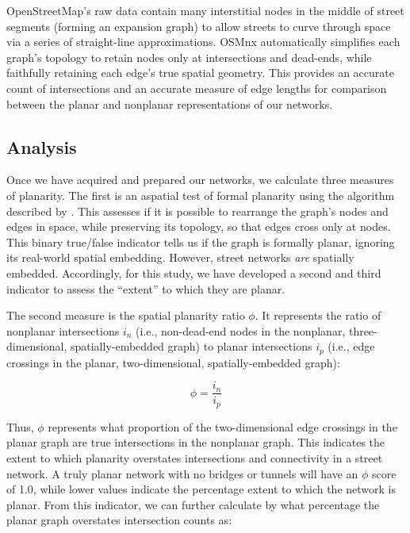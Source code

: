 \documentclass[Afour,sageh,times]{sagej}
\begin{document}
OpenStreetMap's raw data contain many interstitial nodes in the middle of street segments (forming an expansion graph) to allow streets to curve through space via a series of straight-line approximations. OSMnx automatically simplifies each graph's topology to retain nodes only at intersections and dead-ends, while faithfully retaining each edge's true spatial geometry. This provides an accurate count of intersections and an accurate measure of edge lengths for comparison between the planar and nonplanar representations of our networks.

\subsection{Analysis}

Once we have acquired and prepared our networks, we calculate three measures of planarity. The first is an aspatial test of formal planarity using the algorithm described by \citet{boyer_subgraph_2012}. This assesses if it is possible to rearrange the graph's nodes and edges in space, while preserving its topology, so that edges cross only at nodes. This binary true/false indicator tells us if the graph is formally planar, ignoring its real-world spatial embedding. However, street networks \emph{are} spatially embedded. Accordingly, for this study, we have developed a second and third indicator to assess the \enquote{extent} to which they are planar.

The second measure is the spatial planarity ratio $\phi$. It represents the ratio of nonplanar intersections $i_n$ (i.e., non-dead-end nodes in the nonplanar, three-dimensional, spatially-embedded graph) to planar intersections $i_p$ (i.e., edge crossings in the planar, two-dimensional, spatially-embedded graph): 

\begin{equation}
	\label{eq:spr}
	\phi = \frac{i_n}{i_p}
\end{equation}

Thus, $\phi$ represents what proportion of the two-dimensional edge crossings in the planar graph are true intersections in the nonplanar graph. This indicates the extent to which planarity overstates intersections and connectivity in a street network. A truly planar network with no bridges or tunnels will have an $\phi$ score of 1.0, while lower values indicate the percentage extent to which the network is planar. From this indicator, we can further calculate by what percentage the planar graph overstates intersection counts as:
\end{document}
